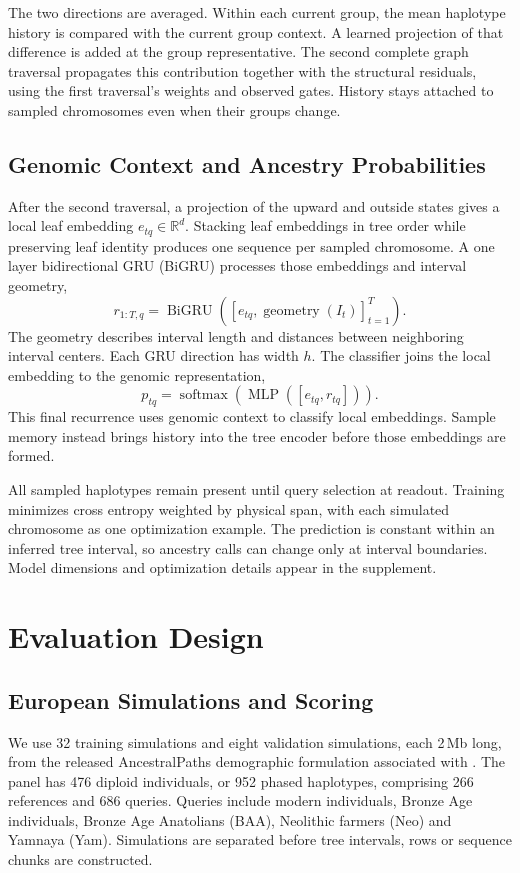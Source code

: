 \documentclass[letterpaper]{article}
\begin{document}
The two directions are averaged. Within each current group, the mean haplotype history is compared with the current group context. A learned projection of that difference is added at the group representative. The second complete graph traversal propagates this contribution together with the structural residuals, using the first traversal's weights and observed gates. History stays attached to sampled chromosomes even when their groups change.

\subsection{Genomic Context and Ancestry Probabilities}
After the second traversal, a projection of the upward and outside states gives a local leaf embedding $e_{tq}\in\mathbb{R}^{d}$. Stacking leaf embeddings in tree order while preserving leaf identity produces one sequence per sampled chromosome. A one layer bidirectional GRU (BiGRU) processes those embeddings and interval geometry,
\begin{equation}
r_{1:T,q}=\operatorname{BiGRU}
\left([e_{tq},\operatorname{geometry}(I_t)]_{t=1}^T\right).
\end{equation}
The geometry describes interval length and distances between neighboring interval centers. Each GRU direction has width $h$. The classifier joins the local embedding to the genomic representation,
\begin{equation}
p_{tq}=\operatorname{softmax}
\left(\operatorname{MLP}([e_{tq},r_{tq}])\right).
\end{equation}
This final recurrence uses genomic context to classify local embeddings. Sample memory instead brings history into the tree encoder before those embeddings are formed.

All sampled haplotypes remain present until query selection at readout. Training minimizes cross entropy weighted by physical span, with each simulated chromosome as one optimization example. The prediction is constant within an inferred tree interval, so ancestry calls can change only at interval boundaries. Model dimensions and optimization details appear in the supplement.

\section{Evaluation Design}
\subsection{European Simulations and Scoring}
We use 32 training simulations and eight validation simulations, each 2\,Mb long, from the released AncestralPaths demographic formulation associated with \citet{eurasians2024}. The panel has 476 diploid individuals, or 952 phased haplotypes, comprising 266 references and 686 queries. Queries include modern individuals, Bronze Age individuals, Bronze Age Anatolians (BAA), Neolithic farmers (Neo) and Yamnaya (Yam). Simulations are separated before tree intervals, rows or sequence chunks are constructed.
\end{document}
